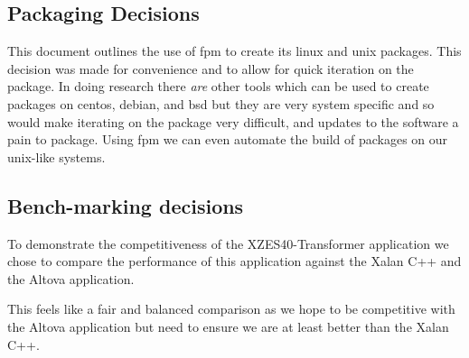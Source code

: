 \subsection{Packaging Decisions}

This document outlines the use of \gls{fpm} to create its \gls{linux} and \gls{unix} packages.
This decision was made for convenience and to allow for quick iteration on the package.
In doing research there \textit{are} other tools which can be used to create packages on \gls{centos}, \gls{debian}, and \gls{bsd} but they are very system specific and so would make iterating on the package very difficult, and updates to the software a pain to package.
Using \gls{fpm} we can even automate the build of packages on our \gls{unix}-like systems.

\subsection{Bench-marking decisions}

To demonstrate the competitiveness of the XZES40-Transformer application we chose to compare the performance of this application against the Xalan C++ and the Altova application.

This feels like a fair and balanced comparison as we hope to be competitive with the Altova application but need to ensure we are at least better than the Xalan C++.

